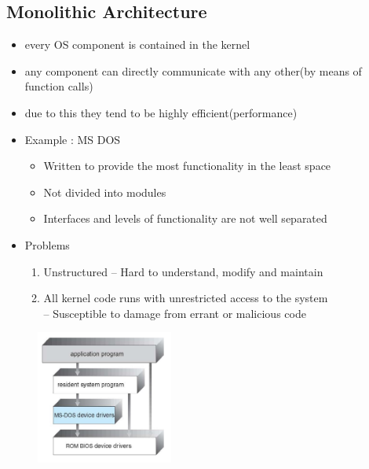 \documentclass[11pt]{article}
\theoremstyle{definition}
\begin{document}
    \subsection{Monolithic Architecture}
        \begin{itemize}
            \item every OS component is contained in the kernel
            \item any component can directly communicate with any other(by means of function calls)
            \item due to this they tend to be highly efficient(performance)
            \item Example : MS DOS
                \begin{itemize}
                    \item Written to provide the most functionality in the least space
                    \item Not divided into modules
                    \item Interfaces and levels of functionality are not well separated
                \end{itemize}
            \item Problems
             \begin{enumerate}
                 \item Unstructured -- Hard to understand, modify and maintain
                 \item All kernel code runs with unrestricted access to the system \\-- Susceptible to damage from errant or malicious code 
             \end{enumerate}
        
             
        \end{itemize}

        \begin{figure}[h]
    \centering
    \includegraphics[width=0.4\textwidth]{Operating System/img/MS_DOS.jpg} 
    \label{fig:a}
\end{figure}
\end{document}
